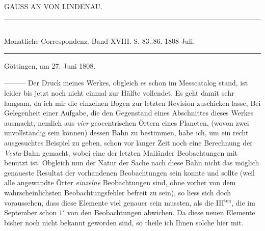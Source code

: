 \clearpage
{}
\hypertarget{native-306-lower}{}
\begin{center}GAUSS AN VON LINDENAU.
\end{center}

\begin{center}
\rule{4cm}{0.4pt}\\
\fontsize{10}{12}\selectfont Monatliche Correspondenz. Band XVIII. S. 83..86. 1808 Juli.\\
\rule{4cm}{0.4pt}
\end{center}

\begin{flushright}
Göttingen, am 27. Juni 1808.
\end{flushright}

\noindent —\;—\;— Der Druck meines Werkes, obgleich es schon im Messcatalog stand, ist leider bis jetzt
noch nicht einmal zur Hälfte vollendet. Es geht damit sehr langsam, da ich mir die einzelnen
Bogen zur letzten Revision zuschicken lasse, Bei Gelegenheit einer Aufgabe, die den
Gegenstand eines Abschnittes dieses Werkes ausmacht, nemlich aus \emph{vier}
geocentrischen Örtern eines Planeten, (wovon zwei unvollständig sein können) dessen
Bahn zu bestimmen, habe ich, um ein recht ausgesuchtes Beispiel zu geben, schon vor
langer Zeit noch eine Berechnung der \emph{Vesta}-Bahn gemacht, wobei eine der letzten
Mailänder Beobachtungen mit benutzt ist. Obgleich nun der Natur der Sache nach diese
Bahn nicht das möglich genaueste Resultat der vorhandenen Beobachtungen sein konnte
und sollte (weil alle angewandte Örter \emph{einzelne} Beobachtungen sind, ohne vorher
von dem wahrscheinlichsten Beobachtungsfehler befreit zu sein), so liess sich doch
voraussehen, dass diese Elemente viel genauer sein mussten, als die III$^{\text{ten}}$,
die im September schon $1'$ von den Beobachtungen abwichen. Da diese neuen Elemente
bisher noch nicht bekannt geworden sind, so theile ich Ihnen solche hier mit.


